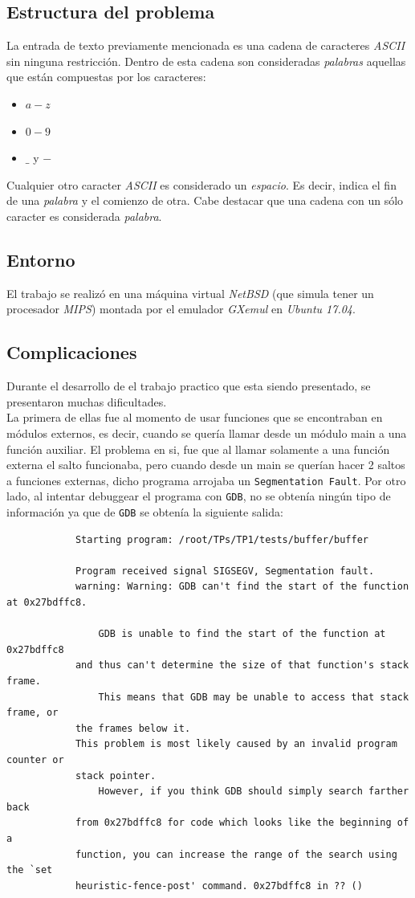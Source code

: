 \documentclass[a4paper, 10pt]{article}
\def\code#1{\texttt{#1}}
\newcommand\tab[1][0.5cm]{\hspace*{#1}}
\begin{document}
		\subsection{Estructura del problema}
			La entrada de texto previamente mencionada es una cadena de caracteres \emph{ASCII}
			sin ninguna restricción. Dentro de esta cadena son consideradas \emph{palabras} aquellas
			que están compuestas por los caracteres:
			\begin{itemize}
				\item $a-z$
				\item $0-9$
				\item $\_$ y $-$
			\end{itemize}
			\tab Cualquier otro caracter \emph{ASCII} es considerado un \emph{espacio}. Es decir,
			indica el fin de una \emph{palabra} y el comienzo de otra. Cabe destacar que una cadena
			con un sólo caracter es considerada \emph{palabra}.
		\subsection{Entorno}
			El trabajo se realizó en una máquina virtual \emph{NetBSD} (que simula tener un procesador
			\emph{MIPS}) montada por el emulador \emph{GXemul} en \emph{Ubuntu 17.04}.
		\subsection{Complicaciones}
			
			Durante el desarrollo de el trabajo practico que esta siendo presentado, se presentaron muchas dificultades. \\
			La primera de ellas fue al momento de usar funciones que se encontraban en módulos externos, es decir, cuando se quería llamar desde un módulo main a una función auxiliar. El problema en si, fue que al llamar solamente a una función externa el salto funcionaba, pero cuando desde un main se querían hacer 2 saltos a funciones externas, dicho programa arrojaba un \code{Segmentation Fault}. Por otro lado, al intentar debuggear el programa con \code{GDB}, no se obtenía ningún tipo de información ya que de \code{GDB} se obtenía la siguiente salida:
			
		\begin{verbatim}
			Starting program: /root/TPs/TP1/tests/buffer/buffer

			Program received signal SIGSEGV, Segmentation fault.
			warning: Warning: GDB can't find the start of the function at 0x27bdffc8.

   				GDB is unable to find the start of the function at 0x27bdffc8
			and thus can't determine the size of that function's stack frame.
				This means that GDB may be unable to access that stack frame, or
			the frames below it.
    		This problem is most likely caused by an invalid program counter or
			stack pointer.
    			However, if you think GDB should simply search farther back
			from 0x27bdffc8 for code which looks like the beginning of a
			function, you can increase the range of the search using the `set
			heuristic-fence-post' command. 0x27bdffc8 in ?? ()
		\end{verbatim}
		
\end{document}
